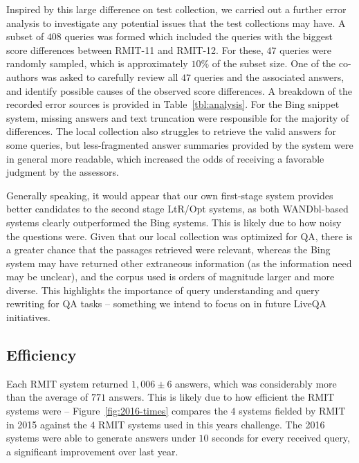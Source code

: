 \documentclass[a4paper,10pt,conference,compsocconf,final]{IEEEtran}
\newcommand{\shane}[1]{\textrm{\textcolor{orange}{Shane says: #1}}}
\begin{document}
Inspired by this large difference on test collection, we carried out
a further error analysis to investigate any potential issues that the
test collections may have.
A subset of $408$ queries was formed which included the queries with
the biggest score differences between RMIT-11 and RMIT-12.
For these, $47$ queries were randomly sampled, which
is approximately $10\%$ of the subset size.
One of the co-authors was asked to carefully review all $47$ queries
and the associated answers, and identify possible causes of the
observed score differences.
A breakdown of the recorded error sources is provided in
Table~\ref{tbl:analysis}.
For the Bing snippet system, missing answers and text truncation were
responsible for the majority of differences.
The local collection also struggles to retrieve the valid answers
for some queries, but less-fragmented answer summaries provided by
the system were in general more readable, which increased the odds of
receiving a favorable judgment by the assessors.

Generally speaking, it would appear that our own first-stage system
provides better candidates to the second stage LtR/Opt systems, as
both {\footnotesize{\sf WANDbl}}-based systems clearly outperformed
the Bing systems.
This is likely due to how noisy the questions were.
Given that our local collection was optimized for QA, there is a
greater chance that the passages retrieved were relevant, whereas the
Bing system may have returned other extraneous information (as the
information need may be unclear), and the corpus used is orders
of magnitude larger and more diverse.
This highlights the importance of query understanding and query
rewriting for QA tasks -- something we intend to focus on in
future LiveQA initiatives.

\subsection{Efficiency}\label{sec:effeciency}
Each RMIT system returned $1{,}006\pm6$ answers, which was
considerably more than the average of $771$ answers.
This is likely due to how efficient the RMIT systems were --
Figure~{\ref{fig:2016-times}} compares the $4$ systems fielded by
RMIT in 2015 against the $4$ RMIT systems used in this years
challenge.
The 2016 systems were able to generate answers under $10$ seconds for
every received query, a significant improvement over last year.
\end{document}
